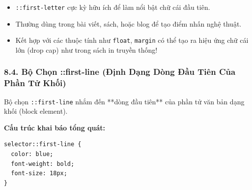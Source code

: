 \documentclass[11pt,oneside]{book}
\newcommand{\codeinline}[1]{\textcolor{accentOrange}{\texttt{#1}}}
\begin{document}
\begin{conceptBox}
\begin{itemize}[leftmargin=1.5em, itemsep=3pt, parsep=0pt]
    \item \codeinline{::first-letter} cực kỳ hữu ích để làm nổi bật chữ cái đầu tiên.
    \item Thường dùng trong bài viết, sách, hoặc blog để tạo điểm nhấn nghệ thuật.
    \item Kết hợp với các thuộc tính như \codeinline{float}, \codeinline{margin} có thể tạo ra hiệu ứng chữ cái lớn (drop cap) như trong sách in truyền thống!
\end{itemize}
\end{conceptBox}

\subsubsection{8.4. Bộ Chọn ::first-line (Định Dạng Dòng Đầu Tiên Của Phần Tử Khối)}

\begin{conceptBox}
Bộ chọn \codeinline{::first-line} nhắm đến **dòng đầu tiên** của phần tử văn bản dạng khối (block element).
\par\vspace{4pt}
\textbf{Cấu trúc khai báo tổng quát:}
\begin{codeWindow}
\begin{lstlisting}[language=CSS3]
selector::first-line {
  color: blue;
  font-weight: bold;
  font-size: 18px;
}
\end{lstlisting}
\end{codeWindow}
\end{conceptBox}
\end{document}
